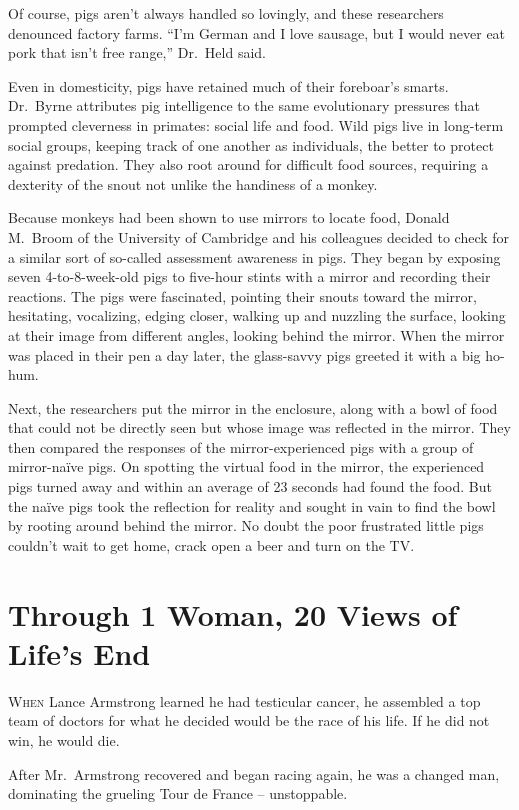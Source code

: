 ﻿\documentclass[12pt]{article}
\begin{document}
Of course, pigs aren't always handled so lovingly, and these researchers denounced factory farms.
``I'm German and I love sausage, but I would never eat pork that isn't free range,'' Dr.~Held said.

Even in domesticity, pigs have retained much of their foreboar's smarts. Dr.~Byrne attributes pig
intelligence to the same evolutionary pressures that prompted cleverness in primates: social life
and food. Wild pigs live in long-term social groups, keeping track of one another as individuals,
the better to protect against predation. They also root around for difficult food sources, requiring
a dexterity of the snout not unlike the handiness of a monkey.

Because monkeys had been shown to use mirrors to locate food, Donald M.~Broom of the University of
Cambridge and his colleagues decided to check for a similar sort of so-called assessment awareness
in pigs. They began by exposing seven 4-to-8-week-old pigs to five-hour stints with a mirror and
recording their reactions. The pigs were fascinated, pointing their snouts toward the mirror,
hesitating, vocalizing, edging closer, walking up and nuzzling the surface, looking at their image
from different angles, looking behind the mirror. When the mirror was placed in their pen a day
later, the glass-savvy pigs greeted it with a big ho-hum.

Next, the researchers put the mirror in the enclosure, along with a bowl of food that could not be
directly seen but whose image was reflected in the mirror. They then compared the responses of the
mirror-experienced pigs with a group of mirror-na\"ive pigs. On spotting the virtual food in the
mirror, the experienced pigs turned away and within an average of 23 seconds had found the food. But
the na\"ive pigs took the reflection for reality and sought in vain to find the bowl by rooting
around behind the mirror. No doubt the poor frustrated little pigs couldn't wait to get home, crack
open a beer and turn on the TV.

\section{Through 1 Woman, 20 Views of Life's End}

\lettrine{W}{hen} Lance Armstrong learned he had testicular cancer, he
assembled a top team of doctors for what he decided would be the race of his life. If he did not
win, he would die.

After Mr.~Armstrong recovered and began racing again, he was a changed man, dominating the grueling
Tour de France -- unstoppable.
\end{document}
